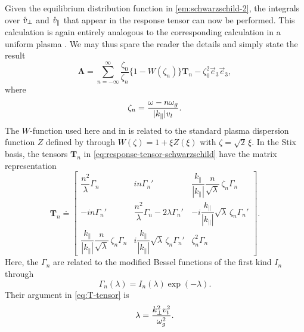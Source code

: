 \documentclass[aps,pre,notitlepage,amsmath,amssymb,amsfonts,nobibnotes,nofootinbib]{revtex4-1}
\begin{document}
Given the equilibrium distribution function in \cref{em:schwarzschild-2}, the
integrals over $\mathring{v}_\perp$ and $\mathring{v}_\parallel$ that appear in the response
tensor  can now be performed. This
calculation is again entirely analogous to the corresponding calculation in a
uniform plasma \citep[see e.g.][]{Ichimaru1973}. We may thus spare the reader
the details and simply state the result
\begin{equation}
  \label{eq:response-tensor-schwarzschild}
  \mathbf{\Lambda} =
  \sum_{n=-\infty}^\infty\frac{\zeta_0}{\zeta_n}
  \{1 - W(\zeta_n)\}\mathbf{T}_n - \zeta_0^2\vec{e}_3\vec{e}_3,
\end{equation}
where
\begin{equation}
  \label{eq:zeta-def}
  \zeta_n = \frac{\omega - n\omg}{|k_\parallel|\vt}.
\end{equation}
The $W$-function used here and in \citet{Ichimaru1973} is related to the
standard plasma dispersion function $Z$ defined by \citet{Fried1961} through
$W(\zeta)=1+\xi{}Z(\xi)$ with $\zeta=\sqrt{2}\,\xi$. In the Stix basis, the
tensors $\mathbf{T}_n$ in \cref{eq:response-tensor-schwarzschild} have the
matrix representation
\begingroup
\renewcommand*{\arraystretch}{2}
\begin{equation}
  \label{eq:T-tensor}
  \mathbf{T}_n \doteq \left[\begin{matrix}
      \dfrac{n^2}{\lambda}\Gamma_n &
      in\Gamma_n' &
      \dfrac{k_\parallel}{|k_\parallel|}
      \dfrac{n}{\sqrt{\lambda}}\,\zeta_n\Gamma_n \\
      -in\Gamma_n' &
      \dfrac{n^2}{\lambda}\Gamma_n - 2\lambda\Gamma_n' &
      -i\dfrac{k_\parallel}{|k_\parallel|}
      \sqrt{\lambda}\,\zeta_n\Gamma_n' \\
      \dfrac{k_\parallel}{|k_\parallel|}
      \dfrac{n}{\sqrt{\lambda}}\,\zeta_n\Gamma_n &
      i\dfrac{k_\parallel}{|k_\parallel|}
      \sqrt{\lambda}\,\zeta_n\Gamma_n' &
      \zeta_n^2\Gamma_n
  \end{matrix}\right].
\end{equation}
\endgroup
Here, the $\Gamma_n$ are related to the modified Bessel functions of the first
kind $I_n$ through
\begin{equation}
  \label{eq:Gamma-n}
  \Gamma_n(\lambda) = I_n(\lambda)\exp(-\lambda).
\end{equation}
Their argument in \cref{eq:T-tensor} is
\begin{equation}
  \label{eq:chi-def}
  \lambda = \frac{k_\perp^2\vt^2}{\omg^2}.
\end{equation}
\end{document}
